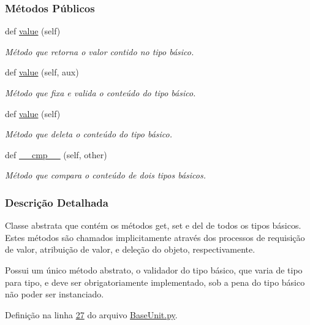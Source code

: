 \subsubsection*{Métodos Públicos}
\begin{DoxyCompactItemize}
\item 
def \hyperlink{classELO_1_1BaseUnit_1_1IfBaseType_a2534c3548a8e5991dde0a64b4f0b542b}{value} (self)
\begin{DoxyCompactList}\small\item\em Método que retorna o valor contido no tipo básico. \end{DoxyCompactList}\item 
def \hyperlink{classELO_1_1BaseUnit_1_1IfBaseType_af9e438002f812334ca436deec3078c6f}{value} (self, aux)
\begin{DoxyCompactList}\small\item\em Método que fixa e valida o conteúdo do tipo básico. \end{DoxyCompactList}\item 
def \hyperlink{classELO_1_1BaseUnit_1_1IfBaseType_a2534c3548a8e5991dde0a64b4f0b542b}{value} (self)
\begin{DoxyCompactList}\small\item\em Método que deleta o conteúdo do tipo básico. \end{DoxyCompactList}\item 
def \hyperlink{classELO_1_1BaseUnit_1_1IfBaseType_a22d6f30c4d9504a9c20d0ff5a538544d}{\+\_\+\+\_\+cmp\+\_\+\+\_\+} (self, other)
\begin{DoxyCompactList}\small\item\em Método que compara o conteúdo de dois tipos básicos. \end{DoxyCompactList}\end{DoxyCompactItemize}


\subsubsection{Descrição Detalhada}
Classe abstrata que contém os métodos get, set e del de todos os tipos básicos. Estes métodos são chamados implicitamente através dos processos de requisição de valor, atribuição de valor, e deleção do objeto, respectivamente.

Possui um único método abstrato, o validador do tipo básico, que varia de tipo para tipo, e deve ser obrigatoriamente implementado, sob a pena do tipo básico não poder ser instanciado. 

Definição na linha \hyperlink{BaseUnit_8py_source_l00027}{27} do arquivo \hyperlink{BaseUnit_8py_source}{Base\+Unit.\+py}.



